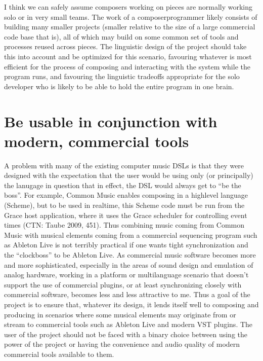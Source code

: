 \documentclass[letterpaper,10pt,english]{sphinxmanual}
\begin{document}
\sphinxAtStartPar
I think we can safely assume composers working on pieces are normally working solo or in very small teams.
The work of a composer\sphinxhyphen{}programmer likely consists of building many smaller projects (smaller relative to the size of a large
commercial code base that is), all of which may build on some common set of tools and processes reused across pieces.
The linguistic design of the project should take this into account and be optimized for this scenario,
favouring whatever is most efficient for the process of composing and interacting with the system while the program runs,
and favouring the linguistic tradeoffs appropriate for the solo developer who is likely to be able to
hold the entire program in one brain.


\section{Be usable in conjunction with modern, commercial tools}
\label{\detokenize{goals:be-usable-in-conjunction-with-modern-commercial-tools}}
\sphinxAtStartPar
A problem with many of the existing computer music DSLs is that they were designed with the
expectation that the user would be using only (or principally) the lanugage in question \sphinxhyphen{} that in effect,
the DSL would always get to “be the boss”.
For example, Common Music enables composing in a high\sphinxhyphen{}level language (Scheme), but to be used in real\sphinxhyphen{}time,
this Scheme code must be run from the Grace host application, where it uses the Grace scheduler for
controlling event times (CTN: Taube 2009, 451).
Thus combining music coming from Common Music with musical elements coming from a commercial sequencing program such as
Ableton Live is not terribly practical if one wants tight synchronization and the “clock\sphinxhyphen{}boss” to be Ableton Live.
As commercial music software becomes more and more sophisticated, especially in the areas of sound design
and emulation of analog hardware, working in a platform or multi\sphinxhyphen{}language scenario that doesn’t support
the use of commercial plugins, or at least synchronizing closely with commercial software, becomes less and less attractive to me.
Thus a goal of the project is to ensure that, whatever its design, it lends itself well to composing and
producing in scenarios where some musical elements may originate from or stream to commercial tools such
as Ableton Live and modern VST plugins.
The user of the project should not be faced with a binary choice between using the power of the project or
having the convenience and audio quality of modern commercial tools available to them.
\end{document}
